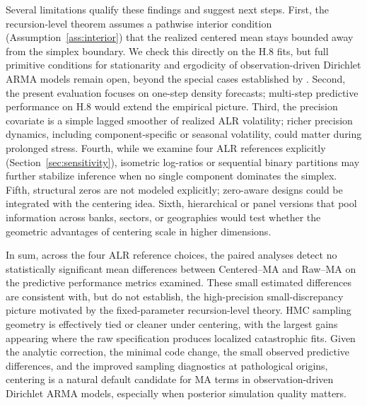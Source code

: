 \documentclass[12pt]{article}
\theoremstyle{remark}
\begin{document}
Several limitations qualify these findings and suggest next steps. First, the recursion-level theorem assumes a pathwise interior condition (Assumption~\ref{ass:interior}) that the realized centered mean stays bounded away from the simplex boundary. We check this directly on the H.8 fits, but full primitive conditions for stationarity and ergodicity of observation-driven Dirichlet ARMA models remain open, beyond the special cases established by \citet{zheng2017dirichlet}. Second, the present evaluation focuses on one-step density forecasts; multi-step predictive performance on H.8 would extend the empirical picture. Third, the precision covariate is a simple lagged smoother of realized ALR volatility; richer precision dynamics, including component-specific or seasonal volatility, could matter during prolonged stress. Fourth, while we examine four ALR references explicitly (Section~\ref{sec:sensitivity}), isometric log-ratios or sequential binary partitions may further stabilize inference when no single component dominates the simplex. Fifth, structural zeros are not modeled explicitly; zero-aware designs could be integrated with the centering idea. Sixth, hierarchical or panel versions that pool information across banks, sectors, or geographies would test whether the geometric advantages of centering scale in higher dimensions.

In sum, across the four ALR reference choices, the paired analyses detect no statistically significant mean differences between Centered--MA and Raw--MA on the predictive performance metrics examined. These small estimated differences are consistent with, but do not establish, the high-precision small-discrepancy picture motivated by the fixed-parameter recursion-level theory. HMC sampling geometry is effectively tied or cleaner under centering, with the largest gains appearing where the raw specification produces localized catastrophic fits. Given the analytic correction, the minimal code change, the small observed predictive differences, and the improved sampling diagnostics at pathological origins, centering is a natural default candidate for MA terms in observation-driven Dirichlet ARMA models, especially when posterior simulation quality matters.

\clearpage
\end{document}
